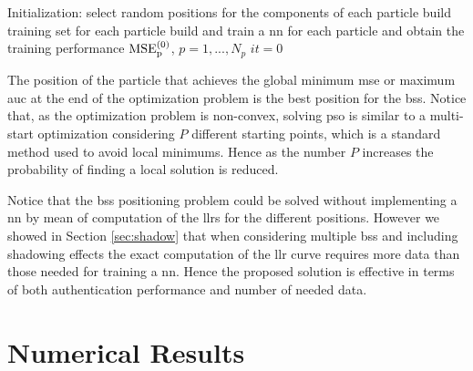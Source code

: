 \documentclass[twocolumns]{IEEEtran}
\begin{document}
 \begin{algorithm}[t]
   \scriptsize

  Initialization: select random positions for the components of each particle\;
                  build training set for each particle\;
                  build and train a \ac{nn} for each particle and obtain the training performance $\rm{MSE}_p^{(0)}$, $p=1,...,N_p$\;
                  $it = 0$\;

    
\caption{BSs positioning algorithm}
 \end{algorithm}

The position of the particle that achieves the global minimum \ac{mse} or maximum \ac{auc} at the end of the optimization problem is the best position for the \acp{bs}. Notice that, as the optimization problem is non-convex, solving \ac{pso} is similar to a multi-start  optimization considering $P$ different starting points, which is a standard method used to avoid local minimums. Hence as the number $P$ increases the probability of finding a local solution is reduced.

Notice that the \acp{bs} positioning problem could be solved without implementing a \ac{nn} by mean of computation of the \acp{llr} for the different positions. However we showed in Section \ref{sec:shadow} that when considering multiple \acp{bs} and including shadowing effects the exact computation of the \ac{llr} curve requires more data than those needed for training a \ac{nn}. Hence the proposed solution is effective in terms of both authentication performance and number of needed data.

\section{Numerical Results}
\end{document}
